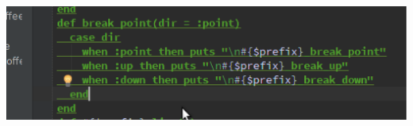 \begin{frame}
	\ \\
	\begin{center}
		\includegraphics[scale=0.6]{scopes/preprocessor.pdf}
	\end{center}
\end{frame}

\begin{frame}
	\inputminted[linenos, frame=lines, label=rubyfunction]{ruby}{scopes/first.rb}
\end{frame}

